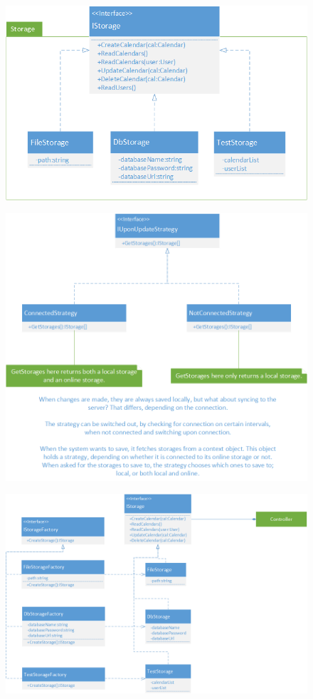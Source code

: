 \documentclass[10pt]{report}
\numberwithin{equation}{section} %
\numberwithin{figure}{section} %
\numberwithin{table}{section} %
\begin{document}
\begin{figure}[H]
  \includegraphics[scale=0.6]{figures/class_storage_bridge.png}
\end{figure}

\begin{figure}[H]
  \includegraphics[scale=0.6]{figures/strategy_pattern.png}
\end{figure}

\begin{figure}[H]
  \includegraphics[scale=0.6]{figures/factory_pattern.png}
\end{figure}
\end{document}
